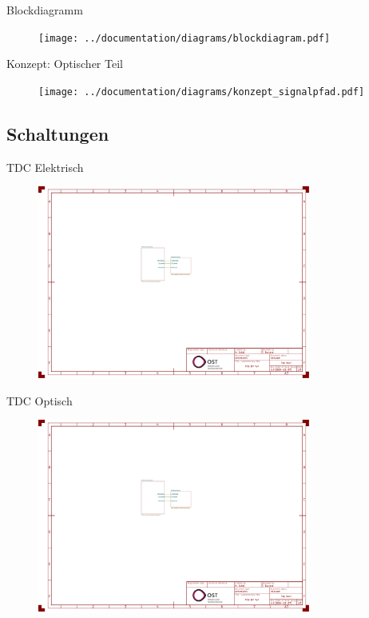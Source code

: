 \begin{frame}{Blockdiagramm}
    \begin{figure}
        \texttt{[image: ../documentation/diagrams/blockdiagram.pdf]}
    \end{figure}
\end{frame}

\begin{frame}{Konzept: Optischer Teil}
    \begin{figure}
        \texttt{[image: ../documentation/diagrams/konzept\_signalpfad.pdf]}
    \end{figure}
\end{frame}

\subsection{Schaltungen}

\begin{frame}{TDC Elektrisch}
    \begin{figure}
        \includegraphics[page=2, trim=80 330 750 310, clip, width=0.8\textwidth]{../documentation/attachments/schematic.pdf}
    \end{figure}
\end{frame}

\begin{frame}{TDC Optisch}
    \begin{figure}
        \includegraphics[page=2, trim=530 330 300 310, clip, width=0.8\textwidth]{../documentation/attachments/schematic.pdf}
    \end{figure}
\end{frame}

